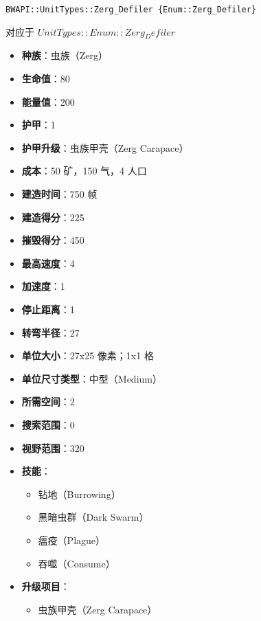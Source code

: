 \begin{tcolorbox}[colback=white, colframe=black!60!white, title=Zerg\_Defiler(), arc=0mm]
    \begin{verbatim}
BWAPI::UnitTypes::Zerg_Defiler {Enum::Zerg_Defiler}
    \end{verbatim}
    对应于  $ UnitTypes::Enum::Zerg_Defiler $ 
    \begin{itemize}
        \item \textbf{种族}：虫族（Zerg）
        \item \textbf{生命值}：80
        \item \textbf{能量值}：200
        \item \textbf{护甲}：1
        \item \textbf{护甲升级}：虫族甲壳（Zerg Carapace）
        \item \textbf{成本}：50 矿，150 气，4 人口
        \item \textbf{建造时间}：750 帧
        \item \textbf{建造得分}：225
        \item \textbf{摧毁得分}：450
        \item \textbf{最高速度}：4
        \item \textbf{加速度}：1
        \item \textbf{停止距离}：1
        \item \textbf{转弯半径}：27
        \item \textbf{单位大小}：27x25 像素；1x1 格
        \item \textbf{单位尺寸类型}：中型（Medium）
        \item \textbf{所需空间}：2
        \item \textbf{搜索范围}：0
        \item \textbf{视野范围}：320
        \item \textbf{技能}：
            \begin{itemize}
                \item 钻地（Burrowing）
                \item 黑暗虫群（Dark Swarm）
                \item 瘟疫（Plague）
                \item 吞噬（Consume）
            \end{itemize}
        \item \textbf{升级项目}：
            \begin{itemize}
                \item 虫族甲壳（Zerg Carapace）

\end{itemize}
\end{itemize}
\end{tcolorbox}
